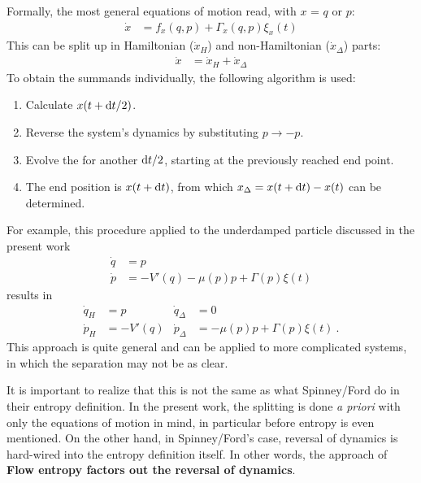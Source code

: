 Formally, the most general equations of motion read, with \(x\) = \(q\) or \(p\):
%
\begin{align}
	\dot x &= f_x(q,p) + \Gamma_x(q,p)\xi_x(t)
\end{align}
%
This can be split up in Hamiltonian (\(\dot x_H\)) and non-Hamiltonian (\(\dot x_\Delta\)) parts:
%
\begin{align}
	\dot x &= \dot x_H + \dot x_\Delta
\end{align}
%
To obtain the summands individually, the following algorithm is used:
%
\begin{enumerate}
	\item Calculate \(x(t+\mathrm{d} t/2) \).
	\item Reverse the system's dynamics by substituting \(p \to -p\).
	\item Evolve the for another \(\mathrm{d} t/2\), starting at the previously reached end point.
	\item The end position is \(x(t+\mathrm{d} t)\), from which \(x_\Delta = x(t+\mathrm{d} t) - x(t)\) can be determined.
\end{enumerate}
%
For example, this procedure applied to the underdamped particle discussed in the present work
%
\begin{align*}
	\dot q &= p \\
	\dot p &= -V'(q) - \mu(p)p + \Gamma(p)\xi(t)
\end{align*}
results in
\begin{align*}
	\dot q_H &= p  &  \dot q_\Delta &= 0 \\
	\dot p_H &= -V'(q)  &  \dot p_\Delta &= - \mu(p)p + \Gamma(p)\xi(t) ~.
\end{align*}
This approach is quite general and can be applied to more complicated systems, in which the separation may not be as clear.

It is important to realize that this is not the same as what Spinney/Ford do in their entropy definition. In the present work, the splitting is done \emph{a priori} with only the equations of motion in mind, in particular before entropy is even mentioned. On the other hand, in Spinney/Ford's case, reversal of dynamics is hard-wired into the entropy definition itself. In other words, the approach of \textbf{Flow entropy factors out the reversal of dynamics}.

